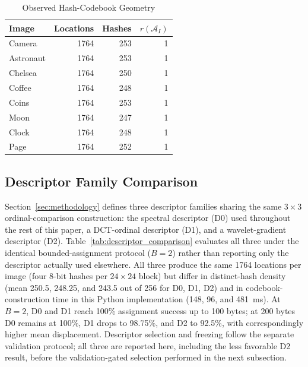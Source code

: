 \documentclass[preprint,12pt]{elsarticle}
\theoremstyle{plain}
\begin{document}
\begin{table}[!t]
\centering
\caption{Observed Hash-Codebook Geometry}
\label{tab:codebook_geometry}
\begin{tabular}{lrrr}
\toprule
\textbf{Image} & \textbf{Locations} & \textbf{Hashes} & $r(\mathcal{A}_I)$ \\
\midrule
Camera    & 1764 & 253 & 1 \\
Astronaut & 1764 & 253 & 1 \\
Chelsea   & 1764 & 250 & 1 \\
Coffee    & 1764 & 248 & 1 \\
Coins     & 1764 & 253 & 1 \\
Moon      & 1764 & 247 & 1 \\
Clock     & 1764 & 248 & 1 \\
Page      & 1764 & 252 & 1 \\
\bottomrule
\end{tabular}
\end{table}

\subsection{Descriptor Family Comparison}

Section~\ref{sec:methodology} defines three descriptor families sharing the
same $3\times3$ ordinal-comparison construction: the spectral descriptor
(D0) used throughout the rest of this paper, a DCT-ordinal descriptor (D1),
and a wavelet-gradient descriptor (D2). Table~\ref{tab:descriptor_comparison}
evaluates all three under the identical bounded-assignment protocol
($B=2$) rather than reporting only the descriptor actually used elsewhere.
All three produce the same 1764 locations per image (four 8-bit hashes per
$24\times24$ block) but differ in distinct-hash density (mean 250.5, 248.25,
and 243.5 out of 256 for D0, D1, D2) and in codebook-construction time in this
Python implementation (148, 96, and 481~ms). At $B=2$, D0 and D1 reach 100\%
assignment success up to 100 bytes; at 200 bytes D0 remains at 100\%, D1
drops to 98.75\%, and D2 to 92.5\%, with correspondingly higher mean
displacement. Descriptor selection and freezing follow the separate
validation protocol; all three are reported here, including the less favorable D2 result, before
the validation-gated selection performed in the next subsection.

\begin{table}[!t]
\centering
\caption{Descriptor Family Comparison Under the Bounded Assignment Protocol ($B=2$)}
\label{tab:descriptor_comparison}
\resizebox{\linewidth}{!}{}
\end{table}
\end{document}
